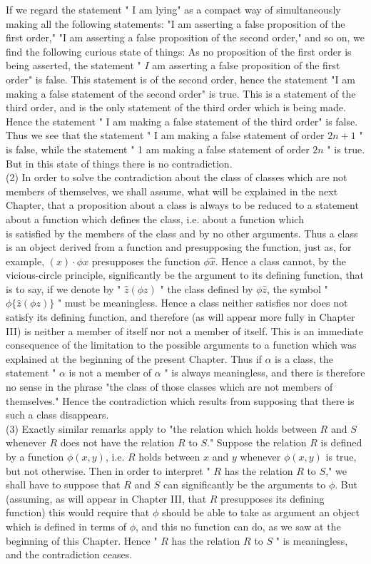 \documentclass[10pt]{article}
\begin{document}
If we regard the statement " I am lying" as a compact way of simultaneously making all the following statements: "I am asserting a false proposition of the first order," "I am asserting a false proposition of the second order," and so on, we find the following curious state of things: As no proposition of the first order is being asserted, the statement " $I$ am asserting a false proposition of the first order" is false. This statement is of the second order, hence the statement "I am making a false statement of the second order" is true. This is a statement of the third order, and is the only statement of the third order which is being made. Hence the statement " I am making a false statement of the third order" is false. Thus we see that the statement " I am making a false statement of order $2 n+1$ " is false, while the statement " 1 am making a false statement of order $2 n$ " is true. But in this state of things there is no contradiction.\\
(2) In order to solve the contradiction about the class of classes which are not members of themselves, we shall assume, what will be explained in the next Chapter, that a proposition about a class is always to be reduced to a statement about a function which defines the class, i.e. about a function which\\
is satisfied by the members of the class and by no other arguments. Thus a class is an object derived from a function and presupposing the function, just as, for example, $(x) \cdot \phi x$ presupposes the function $\phi \hat{x}$. Hence a class cannot, by the vicious-circle principle, significantly be the argument to its defining function, that is to say, if we denote by " $\hat{z}(\phi z)$ " the class defined by $\phi \hat{z}$, the symbol " $\phi\{\hat{z}(\phi z)\}$ " must be meaningless. Hence a class neither satisfies nor does not satisfy its defining function, and therefore (as will appear more fully in Chapter III) is neither a member of itself nor not a member of itself. This is an immediate consequence of the limitation to the possible arguments to a function which was explained at the beginning of the present Chapter. Thus if $\alpha$ is a class, the statement " $\alpha$ is not a member of $\alpha$ " is always meaningless, and there is therefore no sense in the phrase "the class of those classes which are not members of themselves." Hence the contradiction which results from supposing that there is such a class disappears.\\
(3) Exactly similar remarks apply to "the relation which holds between $R$ and $S$ whenever $R$ does not have the relation $R$ to $S$." Suppose the relation $R$ is defined by a function $\phi(x, y)$, i.e. $R$ holds between $x$ and $y$ whenever $\phi(x, y)$ is true, but not otherwise. Then in order to interpret " $R$ has the relation $R$ to $S$," we shall have to suppose that $R$ and $S$ can significantly be the arguments to $\phi$. But (assuming, as will appear in Chapter III, that $R$ presupposes its defining function) this would require that $\phi$ should be able to take as argument an object which is defined in terms of $\phi$, and this no function can do, as we saw at the beginning of this Chapter. Hence " $R$ has the relation $R$ to $S$ " is meaningless, and the contradiction ceases.\\
\end{document}
